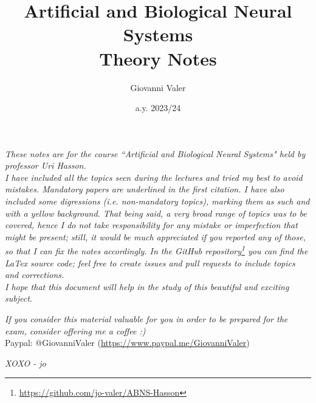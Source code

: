 \documentclass[]{report}
\title{\textbf{Artificial and Biological Neural Systems}\\\large \textbf{Theory Notes}}
\author{Giovanni Valer}
\date{a.y. 2023/24}
\begin{document}
\maketitle
{}

\newpage
{}
\textit{These notes are for the course ``Artificial and Biological Neural Systems" held by professor Uri Hasson.\\
I have included all the topics seen during the lectures and tried my best to avoid mistakes. Mandatory papers are underlined in the first citation. I have also included some digressions (i.e. non-mandatory topics), marking them as such and with a yellow background. That being said, a very broad range of topics was to be covered, hence I do not take responsibility for any mistake or imperfection that might be present; still, it would be much appreciated if you reported any of those, so that I can fix the notes accordingly.
In the GitHub repository\footnote{\url{https://github.com/jo-valer/ABNS-Hasson}} you can find the LaTex source code; feel free to create issues and pull requests to include topics and corrections.\\
I hope that this document will help in the study of this beautiful and exciting subject.}
\newline

\textit{If you consider this material valuable for you in order to be prepared for the exam, consider offering me a coffee :)}\\
Paypal: @GiovanniValer (\url{https://www.paypal.me/GiovanniValer})
\newline

\textit{XOXO - jo}
\restoregeometry
\newpage

\tableofcontents
\clearpage








% 
% 

% 


\end{document}
